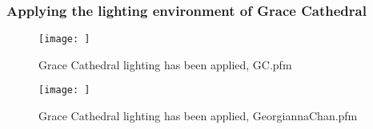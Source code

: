 \documentclass{article}
\begin{document}
\subsubsection{Applying the lighting environment of Grace Cathedral}
\begin{center}
	\begin{figure}[H]
		\begin{center}
			\texttt{[image: ]}
			\caption{Grace Cathedral lighting has been applied, GC.pfm}
		\end{center}
	\end{figure}
\end{center}

\begin{center}
	\begin{figure}[H]
		\begin{center}
			\texttt{[image: ]}
			\caption{Grace Cathedral lighting has been applied, GeorgiannaChan.pfm}
		\end{center}
	\end{figure}
\end{center}
\end{document}
